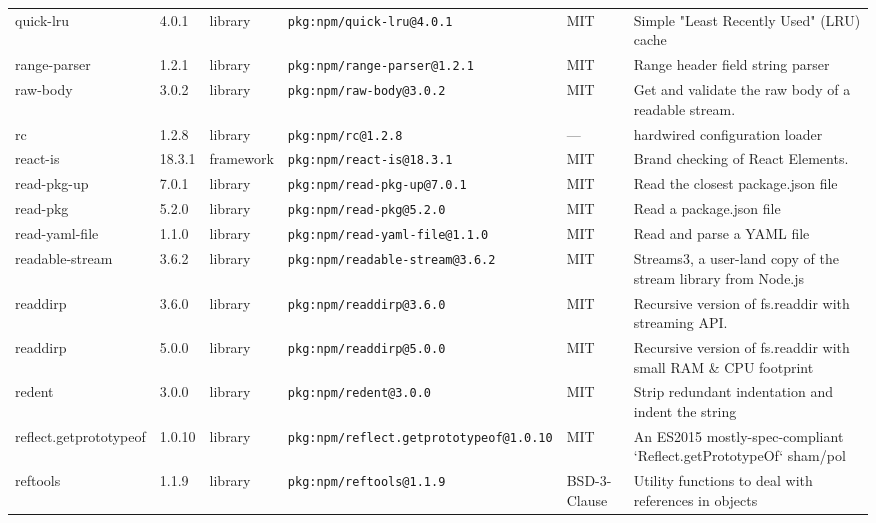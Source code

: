\documentclass[11pt,a4paper]{article}
\begin{document}
\begin{longtable}{|p{4cm}|p{2cm}|p{1.6cm}|p{5cm}|p{1.5cm}|p{3.5cm}|}
\raggedright quick-lru & 4.0.1 & library & \small\texttt{pkg:npm/quick-lru@4.0.1} & MIT & \small Simple "Least Recently Used" (LRU) cache \\
\raggedright range-parser & 1.2.1 & library & \small\texttt{pkg:npm/range-parser@1.2.1} & MIT & \small Range header field string parser \\
\raggedright raw-body & 3.0.2 & library & \small\texttt{pkg:npm/raw-body@3.0.2} & MIT & \small Get and validate the raw body of a readable stream. \\
\raggedright rc & 1.2.8 & library & \small\texttt{pkg:npm/rc@1.2.8} & — & \small hardwired configuration loader \\
\raggedright react-is & 18.3.1 & framework & \small\texttt{pkg:npm/react-is@18.3.1} & MIT & \small Brand checking of React Elements. \\
\raggedright read-pkg-up & 7.0.1 & library & \small\texttt{pkg:npm/read-pkg-up@7.0.1} & MIT & \small Read the closest package.json file \\
\raggedright read-pkg & 5.2.0 & library & \small\texttt{pkg:npm/read-pkg@5.2.0} & MIT & \small Read a package.json file \\
\raggedright read-yaml-file & 1.1.0 & library & \small\texttt{pkg:npm/read-yaml-file@1.1.0} & MIT & \small Read and parse a YAML file \\
\raggedright readable-stream & 3.6.2 & library & \small\texttt{pkg:npm/readable-stream@3.6.2} & MIT & \small Streams3, a user-land copy of the stream library from Node.js \\
\raggedright readdirp & 3.6.0 & library & \small\texttt{pkg:npm/readdirp@3.6.0} & MIT & \small Recursive version of fs.readdir with streaming API. \\
\raggedright readdirp & 5.0.0 & library & \small\texttt{pkg:npm/readdirp@5.0.0} & MIT & \small Recursive version of fs.readdir with small RAM \& CPU footprint \\
\raggedright redent & 3.0.0 & library & \small\texttt{pkg:npm/redent@3.0.0} & MIT & \small Strip redundant indentation and indent the string \\
\raggedright reflect.getprototypeof & 1.0.10 & library & \small\texttt{pkg:npm/reflect.getprototypeof@1.0.10} & MIT & \small An ES2015 mostly-spec-compliant `Reflect.getPrototypeOf` sham/pol \\
\raggedright reftools & 1.1.9 & library & \small\texttt{pkg:npm/reftools@1.1.9} & BSD-3-Clause & \small Utility functions to deal with references in objects \\

\end{longtable}
\end{document}
